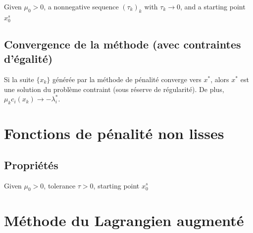 \begin{algorithm}[H]
    \caption{Quadratic penalty method}
    \SetAlgoLined
    Given $\mu_0>0$, a nonnegative sequence $(\tau_k)_k$ with $\tau_k \to 0$, and a starting point $x_0^s$\;
\end{algorithm}

\subsection{Convergence de la méthode (avec contraintes d'égalité)}

\begin{theoreme}[Convergence]
    Si la suite $\{x_k\}$ générée par la méthode de pénalité converge vers $x^*$, alors $x^*$ est une solution du problème contraint (sous réserve de régularité). De plus, $\mu_k c_i(x_k) \to -\lambda_i^*$.
\end{theoreme}

\section{Fonctions de pénalité non lisses}

\subsection{Propriétés}

\begin{algorithm}[H]
    \caption{Classical $\ell^1$ penalty method}
    \SetAlgoLined
    Given $\mu_0>0$, tolerance $\tau>0$, starting point $x_0^s$\;
\end{algorithm}



\section{Méthode du Lagrangien augmenté}

